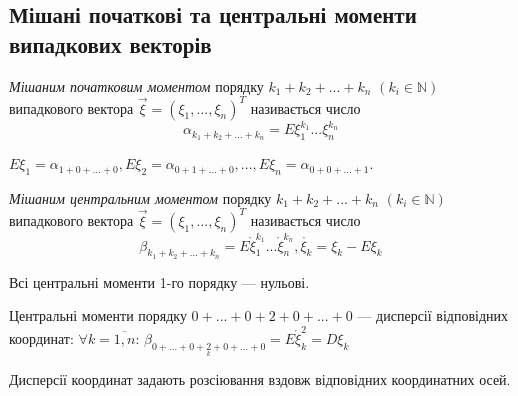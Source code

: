 \subsection{Мішані початкові та центральні 
            моменти випадкових векторів}
\begin{definition}
    \emph{Мішаним початковим моментом} порядку 
    $k_1+k_2+...+k_n$ 
    $\left(k_i \in \mathbb{N}\right)$
    випадкового вектора 
    $\vec{\xi} = \left(\xi_1, ..., \xi_n\right)^T$
    називається число
    \begin{equation*}
        \alpha_{k_1+k_2+...+k_n} = 
        E{\xi_1^{k_1}...\xi_n^{k_n}}
    \end{equation*}
\end{definition}
\begin{remark}
    $E\xi_1 = \alpha_{1+0+...+0}, E\xi_2 = \alpha_{0+1+...+0},
    ..., E\xi_n = \alpha_{0+0+...+1}$.
\end{remark}
\begin{definition}
    \emph{Мішаним центральним моментом} порядку 
    $k_1+k_2+...+k_n$
    $\left(k_i \in \mathbb{N}\right)$ 
    випадкового вектора
    $\vec{\xi} = \left(\xi_1, ..., \xi_n\right)^T$
    називається число
    \begin{equation*}
        \beta_{k_1+k_2+...+k_n} = 
        E{\mathring{\xi}_1^{k_1}
        ...
        \mathring{\xi}_n^{k_n}},
        \mathring{\xi_k} = \xi_k - E\xi_k
    \end{equation*}
\end{definition}
\begin{remark}
    Всі центральні моменти 1-го порядку --- 
    нульові.
\end{remark}
Центральні моменти порядку $0+...+0+2+0+...+0$ --- дисперсії відповідних координат:
    $\forall k = \overline{1,n}$: 
    $\beta_{0+...+0+\underset{k}{2}
    +0+...+0} = E\mathring{\xi}_k^2 = 
    D\xi_k$

Дисперсії координат задають розсіювання 
вздовж відповідних координатних осей.

